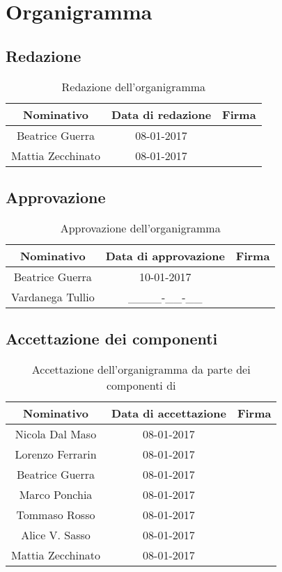 \appendix

\section{Organigramma}
\subsection{Redazione}

\begin{table}[H]
  \centering
  \begin{tabular}{|c|c|p{4cm}|}
  \hline
  \textbf{Nominativo} &
  \textbf{Data di redazione} &
  \textbf{Firma} \\
  \hline
  Beatrice Guerra & 08-01-2017 &  \\
  \hline
	Mattia Zecchinato & 08-01-2017 &  \\
\hline
  \end{tabular}
  \caption{Redazione dell'organigramma}
\end{table}

\subsection{Approvazione}

\begin{table}[H]
  \centering
  \begin{tabular}{|c|c|p{4cm}|}
  \hline
  \textbf{Nominativo} &
  \textbf{Data di approvazione} &
  \textbf{Firma} \\
  \hline
  Beatrice Guerra & 10-01-2017 &  \\
  \hline
  Vardanega Tullio & \_\_\_\_-\_\_-\_\_ &  \\
  \hline
  \end{tabular}
  \caption{Approvazione dell'organigramma}
\end{table}

\subsection{Accettazione dei componenti}

\begin{table}[H]
  \centering
  \begin{tabular}{|c|c|p{4cm}|}
  \hline
  \textbf{Nominativo} &
  \textbf{Data di accettazione} &
  \textbf{Firma} \\
  \hline
  Nicola Dal Maso& 08-01-2017 &  \\
  \hline
  Lorenzo Ferrarin& 08-01-2017 &  \\
  \hline
  Beatrice Guerra& 08-01-2017 &  \\
  \hline
  Marco Ponchia& 08-01-2017 &  \\
  \hline
  Tommaso Rosso& 08-01-2017 &  \\
  \hline
  Alice V. Sasso& 08-01-2017 &  \\
  \hline
  Mattia Zecchinato& 08-01-2017 &  \\
  \hline
  \end{tabular}
  \caption{Accettazione dell'organigramma da parte dei componenti di \GroupName{}}
\end{table}

